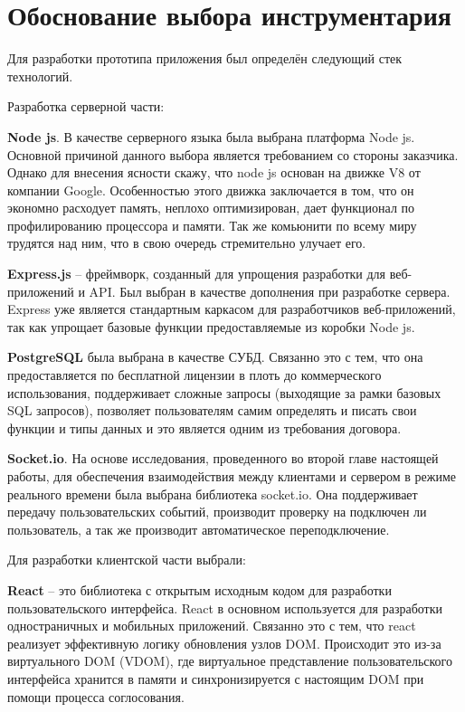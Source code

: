 
\section{Обоснование выбора инструментария} \label{ch3:sec3}

Для разработки прототипа приложения был определён следующий стек технологий.

Разработка серверной части:

\textbf{Node js}. В качестве серверного языка была выбрана платформа Node js. Основной причиной данного выбора является требованием со стороны заказчика. Однако для внесения ясности скажу, что node js основан на движке V8 от компании Google. Особенностью этого движка заключается в том, что он экономно расходует память, неплохо оптимизирован, дает функционал по профилированию процессора и памяти. Так же комьюнити по всему миру трудятся над ним, что в свою очередь стремительно улучает его.

\textbf{Express.js} – фреймворк, созданный для упрощения разработки для веб-приложений и API. Был выбран в качестве дополнения при разработке сервера. Express уже является стандартным каркасом для разработчиков веб-приложений, так как упрощает базовые функции предоставляемые из коробки Node js.

\textbf{PostgreSQL} была выбрана в качестве СУБД. Связанно это с тем, что она предоставляется по бесплатной лицензии в плоть до коммерческого использования, поддерживает сложные запросы (выходящие за рамки базовых SQL запросов), позволяет пользователям самим определять и писать свои функции и типы данных и это является одним из требования договора.

\textbf{Socket.io}. На основе исследования, проведенного во второй главе настоящей работы, для обеспечения взаимодействия между клиентами и сервером в режиме реального времени была выбрана библиотека socket.io. Она поддерживает передачу пользовательских событий, производит проверку на подключен ли пользователь, а так же производит автоматическое переподключение.

Для разработки клиентской части выбрали:

\textbf{React} – это библиотека с открытым исходным кодом для разработки пользовательского интерфейса. React в основном используется для разработки одностраничных и мобильных приложений. Связанно это с тем, что react реализует эффективную логику обновления узлов DOM. Происходит это из-за виртуального DOM (VDOM), где виртуальное представление пользовательского интерфейса хранится в памяти и синхронизируется с настоящим DOM при помощи процесса соглосования.

